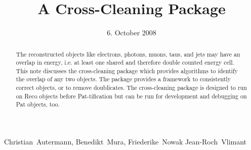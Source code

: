 \documentclass{cmspaper}
\begin{document}

\begin{titlepage}

   \date{6. October 2008}

  \title{A Cross-Cleaning Package}

  \begin{Authlist}
    Christian~Autermann, Benedikt~Mura, Friederike~Nowak
    Jean-Roch~Vlimant


  \end{Authlist}



  \begin{abstract}
    The reconstructed objects like electrons, photons, muons, taus, and
    jets may have an overlap in energy, i.e. at least one shared and therefore
    double counted energy cell. This note discusses the cross-cleaning package
    which provides algorithms to identify the overlap of any two objects. The
    package provides a framework to consistently correct objects, or to remove
    doublicates. 
    The cross-cleaning package is designed to run on {\sc Reco} objects before
    {\sc Pat}-tification but can be run for development and debugging on {\sc
    Pat} objects, too.
  \end{abstract} 

  
\end{titlepage}

\setcounter{page}{2}%
\end{document}
